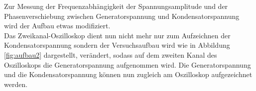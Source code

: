 Zur Messung der Frequenzabhängigkeit der Spannungsamplitude und der Phasenverschiebung zwischen Generatorspannung und Kondensatorspannung wird der Aufbau etwas modifiziert.\\
Das Zweikanal-Oszilloskop dient nun nicht mehr nur zum Aufzeichnen der Kondensatorspannung sondern der Versuchsaufbau wird wie in Abbildung \eqref{fig:aufbau2} dargestellt, verändert, sodass auf dem zweiten Kanal des Oszilloskops die Generatorspannung aufgenommen wird.
Die Generatorspannung und die Kondensatorspannung können nun zugleich am Oszilloskop aufgezeichnet werden.
